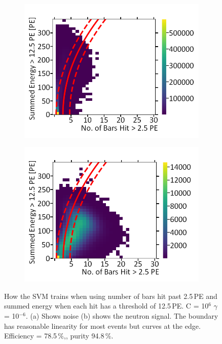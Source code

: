 \begin{figure}[!h]
\centering
\begin{subfigure}{.5\textwidth}
  \centering
  \includegraphics[width=\linewidth]{Appendix1/Figs/Bars1Sum2Noise.png}
  \captionsetup{width=.9\linewidth}
  \caption{}
  \label{subFig:Bars1Sum2N}
\end{subfigure}%
\begin{subfigure}{.5\textwidth}
  \centering
\includegraphics[width=\linewidth]{Appendix1/Figs/Bars1Sum2Signal.png}
  \captionsetup{width=.9\linewidth}
  \caption{}
  \label{subFig:Bars1Sum2S}
\end{subfigure}
\caption[LIBLINEAR SVM Nyström approximated RBF kernel for number of bars hit > 2.5\,PE vs summed energy > 12.5\,PE.]{How the SVM trains when using number of bars hit past 2.5\,PE and summed energy when each hit has a threshold of 12.5\,PE. C = 10$^6$ $\gamma$ = 10$^{-6}$. (a) Shows noise (b) shows the neutron signal. The boundary has reasonable linearity for most events but curves at the edge. Efficiency = 78.5\,\%,, purity 94.8\,\%.}
\label{fig:Bars1Sum2SN}
\end{figure}

